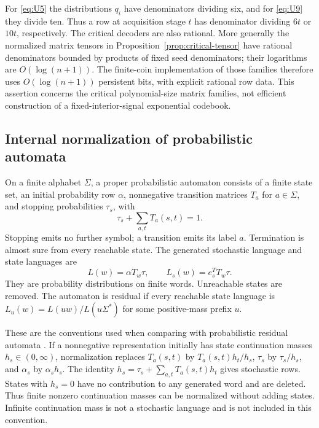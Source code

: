 For \eqref{eq:U5} the distributions $q_i$ have denominators dividing
six, and for \eqref{eq:U9} they divide ten. Thus a row at acquisition
stage $t$ has denominator dividing $6t$ or $10t$, respectively. The
critical decoders are also rational. More generally the normalized
matrix tensors in Proposition~\ref{prop:critical-tensor} have rational
denominators bounded by products of fixed seed denominators; their
logarithms are $O(\log(n+1))$. The finite-coin implementation of those
families therefore uses $O(\log(n+1))$ persistent bits, with explicit
rational row data. This assertion concerns the critical polynomial-size
matrix families, not efficient construction of a fixed-interior-signal
exponential codebook.

\subsection{Internal normalization of probabilistic automata}
\begin{definition}
\label{def:automaton}
On a finite alphabet $\Sigma$, a proper probabilistic automaton consists
of a finite state set, an initial probability row $\alpha$, nonnegative
transition matrices $T_a$ for $a\in\Sigma$, and stopping probabilities
$\tau_s$, with
\[
                  \tau_s+\sum_{a,t}T_a(s,t)=1.
\]
Stopping emits no further symbol; a transition emits its label $a$.
Termination is almost sure from every reachable state. The generated
stochastic language and state languages are
\[
 L(w)=\alpha T_w\tau,\qquad L_s(w)=e_s^TT_w\tau.
\]
They are probability distributions on finite words. Unreachable states
are removed. The automaton is residual if every reachable state language
is $L_u(w)=L(uw)/L(u\Sigma^*)$ for some positive-mass prefix $u$.
\end{definition}

These are the conventions used when comparing with probabilistic
residual automata \cite{ELDD02,DenisEsposito}. If a nonnegative
representation initially has state continuation masses $h_s\in(0,\infty)$,
normalization replaces $T_a(s,t)$ by $T_a(s,t)h_t/h_s$, $\tau_s$ by
$\tau_s/h_s$, and $\alpha_s$ by $\alpha_sh_s$. The identity
$h_s=\tau_s+\sum_{a,t}T_a(s,t)h_t$ gives stochastic rows. States with
$h_s=0$ have no contribution to any generated word and are deleted.
Thus finite nonzero continuation masses can be normalized without
adding states. Infinite continuation mass is not a stochastic language
and is not included in this convention.

